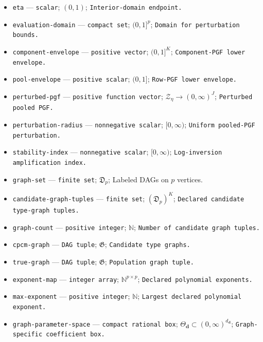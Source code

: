 \documentclass{article}
\begin{document}
\begin{itemize}
  \item \texttt{eta} --- \texttt{scalar}; \((0,1)\); \texttt{Interior-\allowbreak{}domain endpoint.}
  \item \texttt{evaluation-\allowbreak{}domain} --- \texttt{compact set}; \((0,1]^p\); \texttt{Domain for perturbation bounds.}
  \item \texttt{component-\allowbreak{}envelope} --- \texttt{positive vector}; \((0,1]^K\); \texttt{Component-\allowbreak{}PGF lower envelope.}
  \item \texttt{pool-\allowbreak{}envelope} --- \texttt{positive scalar}; \((0,1]\); \texttt{Row-\allowbreak{}PGF lower envelope.}
  \item \texttt{perturbed-\allowbreak{}pgf} --- \texttt{positive function vector}; \(\mathcal Z_\eta\to(0,\infty)^J\); \texttt{Perturbed pooled PGF.}
  \item \texttt{perturbation-\allowbreak{}radius} --- \texttt{nonnegative scalar}; \([0,\infty)\); \texttt{Uniform pooled-\allowbreak{}PGF perturbation.}
  \item \texttt{stability-\allowbreak{}index} --- \texttt{nonnegative scalar}; \([0,\infty)\); \texttt{Log-\allowbreak{}inversion amplification index.}
  \item \texttt{graph-\allowbreak{}set} --- \texttt{finite set}; \(\mathfrak D_p\); Labeled DAGs on \(p\) vertices.
  \item \texttt{candidate-\allowbreak{}graph-\allowbreak{}tuples} --- \texttt{finite set}; \((\mathfrak D_p)^K\); \texttt{Declared candidate type-\allowbreak{}graph tuples.}
  \item \texttt{graph-\allowbreak{}count} --- \texttt{positive integer}; \(\mathbb N\); \texttt{Number of candidate graph tuples.}
  \item \texttt{cpcm-\allowbreak{}graph} --- \texttt{DAG tuple}; \(\mathfrak G\); \texttt{Candidate type graphs.}
  \item \texttt{true-\allowbreak{}graph} --- \texttt{DAG tuple}; \(\mathfrak G\); \texttt{Population graph tuple.}
  \item \texttt{exponent-\allowbreak{}map} --- \texttt{integer array}; \(\mathbb N^{p\times p}\); \texttt{Declared polynomial exponents.}
  \item \texttt{max-\allowbreak{}exponent} --- \texttt{positive integer}; \(\mathbb N\); \texttt{Largest declared polynomial exponent.}
  \item \texttt{graph-\allowbreak{}parameter-\allowbreak{}space} --- \texttt{compact rational box}; \(\Theta_{\boldsymbol d}\subset(0,\infty)^{d_{\boldsymbol d}}\); \texttt{Graph-\allowbreak{}specific coefficient box.}

\end{itemize}
\end{document}
